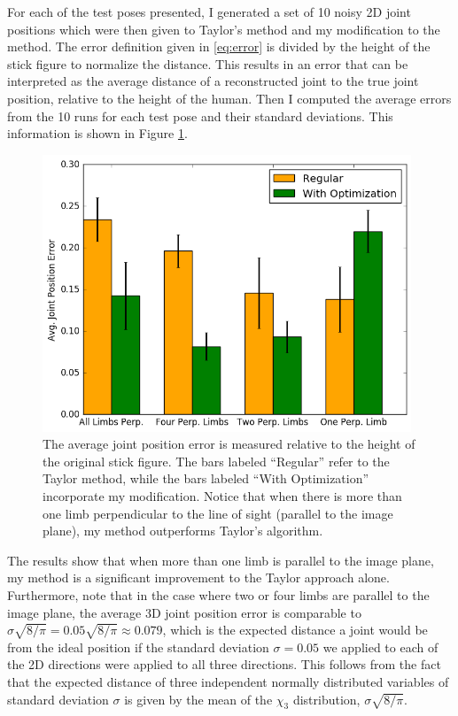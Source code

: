 \documentclass[final]{article}
\begin{document}
\begin{spacing}{1.1}
For each of the test poses presented, I generated a set of 10 noisy 2D joint positions which were then given to Taylor's method and my modification to the method. The error definition given in \ref{eq:error} is divided by the height of the stick figure to normalize the distance. This results in an error that can be interpreted as the average distance of a reconstructed joint to the true joint position, relative to the height of the human. Then I computed the average errors from the 10 runs for each test pose and their standard deviations. This information is shown in Figure \ref{fig:performance}.

\begin{figure}[h]
  \centering
  \includegraphics[width=11cm]{fig/performance.png}
  \caption{The average joint position error is measured relative to the height of the original stick figure. The bars labeled ``Regular'' refer to the Taylor method, while the bars labeled ``With Optimization'' incorporate my modification. Notice that when there is more than one limb perpendicular to the line of sight (parallel to the image plane), my method outperforms Taylor's algorithm.}
  \label{fig:performance}
\end{figure}

  The results show that when more than one limb is parallel to the image plane, my method is a significant improvement to the Taylor approach alone. Furthermore, note that in the case where two or four limbs are parallel to the image plane, the average 3D joint position error is comparable to $\sigma\sqrt{8/\pi} = 0.05\sqrt{8/\pi} \approx 0.079$, which is the expected distance a joint would be from the ideal position if the standard deviation $\sigma = 0.05$ we applied to each of the 2D directions were applied to all three directions. This follows from the fact that the expected distance of three independent normally distributed variables of standard deviation $\sigma$ is given by the mean of the $\chi_3$ distribution, $\sigma\sqrt{8/\pi}$.


\end{spacing}
\end{document}
